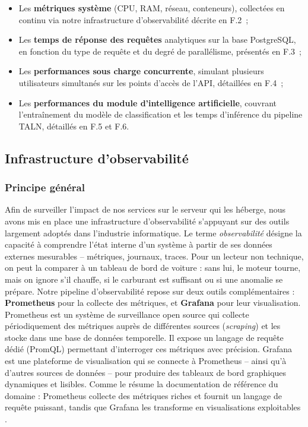 \documentclass[10pt,twocolumn,a4paper]{article}
\begin{document}
\begin{itemize}
    \item Les \textbf{métriques système} (CPU, RAM, réseau, conteneurs),
    collectées en continu via notre infrastructure d'observabilité
    décrite en F.2~;
    \item Les \textbf{temps de réponse des requêtes} analytiques sur
    la base PostgreSQL, en fonction du type de requête et du degré de
    parallélisme, présentés en F.3~;
    \item Les \textbf{performances sous charge concurrente}, simulant
    plusieurs utilisateurs simultanés sur les points d'accès de
    l'API, détaillées en F.4~;
    \item Les \textbf{performances du module d'intelligence artificielle},
    couvrant l'entraînement du modèle de classification et les temps
    d'inférence du pipeline TALN, détaillés en F.5 et F.6.
\end{itemize}

\subsection{Infrastructure d'observabilité}
\subsubsection{Principe général}
Afin de surveiller l'impact de nos services sur le serveur qui les héberge, nous avons mis en place une infrastructure d'observabilité s'appuyant sur des outils largement adoptés dans l'industrie informatique. Le terme \textit{observabilité} désigne la capacité à comprendre l'état interne d'un système à partir de ses données externes mesurables -- métriques, journaux, traces. Pour un lecteur non technique, on peut la comparer à un tableau de bord de voiture : sans lui, le moteur tourne, mais on ignore s'il chauffe, si le carburant est suffisant ou si une anomalie se prépare.
Notre pipeline d'observabilité repose sur deux outils complémentaires : \textbf{Prometheus} pour la collecte des métriques, et \textbf{Grafana} pour leur visualisation.
Prometheus est un système de surveillance open source qui collecte périodiquement des métriques auprès de différentes sources (\textit{scraping}) et les stocke dans une base de données temporelle. Il expose un langage de requête dédié (PromQL) permettant d'interroger ces métriques avec précision. Grafana est une plateforme de visualisation qui se connecte à Prometheus -- ainsi qu'à d'autres sources de données -- pour produire des tableaux de bord graphiques dynamiques et lisibles. Comme le résume la documentation de référence du domaine : Prometheus collecte des métriques riches et fournit un langage de requête puissant, tandis que Grafana les transforme en visualisations exploitables \cite{opsramp2024}.
\end{document}

